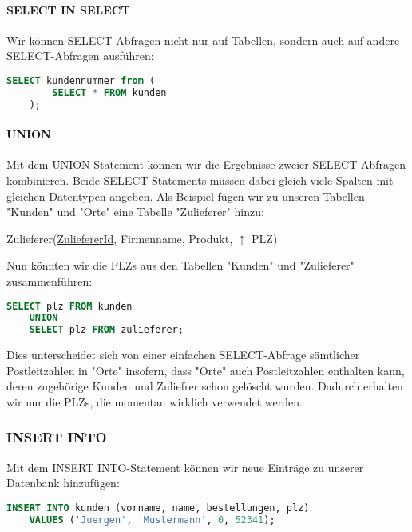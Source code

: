 \documentclass{article}
\begin{document}
	\paragraph{SELECT IN SELECT}
	Wir können SELECT-Abfragen nicht nur auf Tabellen, sondern auch auf andere SELECT-Abfragen ausführen:

	\begin{lstlisting}[language=SQL]
	SELECT kundennummer from (
		SELECT * FROM kunden
	);
	\end{lstlisting}

	\paragraph{UNION}
	Mit dem UNION-Statement können wir die Ergebnisse zweier SELECT-Abfragen kombinieren. Beide SELECT-Statements müssen dabei gleich viele Spalten mit gleichen Datentypen angeben.
	Als Beispiel fügen wir zu unseren Tabellen "Kunden" und "Orte" eine Tabelle "Zulieferer" hinzu:

	\begin{center}
		Zulieferer(\underline{ZuliefererId}, Firmenname, Produkt, $\uparrow$ PLZ) \\
	\end{center}

	Nun könnten wir die PLZs aus den Tabellen "Kunden" und "Zulieferer" zusammenführen:

	\begin{lstlisting}[language=SQL, caption=Wir sammeln sämtliche momentan benutzten PLZs in unserer Datenbank ein]
	SELECT plz FROM kunden
	UNION
	SELECT plz FROM zulieferer;
	\end{lstlisting}

	Dies unterscheidet sich von einer einfachen SELECT-Abfrage sämtlicher Postleitzahlen in "Orte" insofern, dass "Orte" auch Postleitzahlen enthalten kann, deren zugehörige Kunden und Zuliefrer schon gelöscht wurden. Dadurch erhalten wir nur die PLZs, die momentan wirklich verwendet werden.

	\subsubsection{INSERT INTO}
	Mit dem INSERT INTO-Statement können wir neue Einträge zu unserer Datenbank hinzufügen:

	\begin{lstlisting}[language=SQL, caption=Wir fügen neue Einträge zu der Kunden-Tabelle hinzu]
	INSERT INTO kunden (vorname, name, bestellungen, plz) 
	VALUES ('Juergen', 'Mustermann', 0, 52341);
	\end{lstlisting}
\end{document}
